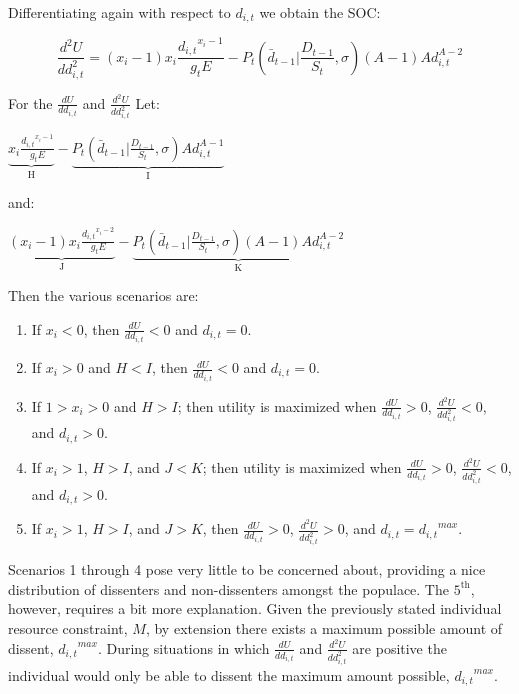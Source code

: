 \documentclass[12pt]{article}
\begin{document}
\begin{spacing}{1.5}
\noindent Differentiating again with respect to $d_{i,t}$ we obtain the SOC: 

\begin{equation}
\frac{d^2U}{dd_{i,t}^2}=(x_i -1) x_i \frac{{d_{i,t}}^{x_i -1}}{g_t E} - P_t \left(\bar{d}_{t-1} \Big|\frac{D_{t-1}}{S_t},\sigma \right)(A-1)Ad_{i,t}^{A-2}  
\end{equation}

\noindent For the $\frac{dU}{dd_{i,t}}$ and $\frac{d^2U}{dd_{i,t}^2}$ Let:    
\begin{center}
$\underbrace{ x_i \frac{{d_{i,t}}^{x_i -1}}{g_tE}}_\textrm{H} - \underbrace{P_t \left(\bar{d}_{t-1} \Big|\frac{D_{t-1}}{S_t},\sigma \right)Ad_{i,t}^{A-1}}_\textrm{I}$  	
\end{center}

\noindent and: 

\begin{center}
$\underbrace{(x_i -1) x_i \frac{{d_{i,t}}^{x_i -2}}{g_t E}}_\textrm{J} -\underbrace{P_t \left(\bar{d}_{t-1}\Big|\frac{D_{t-1}}{S_t},\sigma \right)(A-1)Ad_{i,t}^{A-2}}_\textrm{K}$  
\end{center}

\noindent Then the various scenarios are: 
\begin{enumerate}
\item If $x_i<0$, then $\frac{dU}{dd_{i,t}} < 0$ and $d_{i,t}=0$. 
\item If $x_i>0$ and $H<I$, then $\frac{dU}{dd_{i,t}} < 0$ and $d_{i,t}=0$. 
\item If $1>x_i>0$ and $H>I$; then utility is maximized when $\frac{dU}{dd_{i,t}} > 0$, $\frac{d^2U}{dd_{i,t}^2}<0$, and $d_{i,t}>0$.  
\item If $x_i>1$, $H>I$, and $J<K$; then utility is maximized when $\frac{dU}{dd_{i,t}} > 0$, $\frac{d^2U}{dd_{i,t}^2}<0$, and $d_{i,t}>0$. 
\item If $x_i>1$, $H>I$, and $J>K$, then $\frac{dU}{dd_{i,t}} > 0$, $\frac{d^2U}{dd_{i,t}^2}>0$, and $d_{i,t}={d_{i,t}}^{max} $. 
\end{enumerate}

Scenarios 1 through 4 pose very little to be concerned about, providing a nice distribution of dissenters and non-dissenters amongst the populace. The $\text{5}^{\text{th}}$, however, requires a bit more explanation. Given the previously stated individual resource constraint, $M$, by extension there exists a maximum possible amount of dissent, ${d_{i,t}}^{max}$. During situations in which $\frac{dU}{dd_{i,t}}$ and $\frac{d^2U}{dd_{i,t}^2}$ are positive the individual would only be able to dissent the maximum amount possible, ${d_{i,t}}^{max}$.  


\end{spacing}
\end{document}
